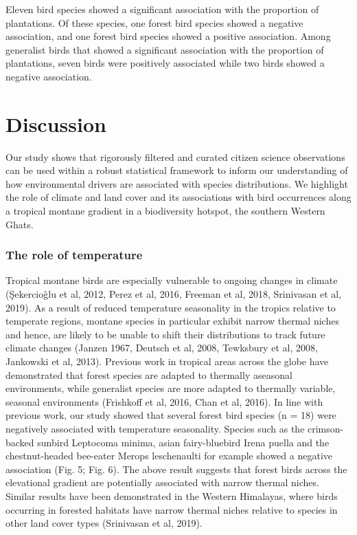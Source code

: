 Eleven bird species showed a significant association with the proportion of plantations.
Of these species, one forest bird species showed a negative association, and one forest bird species showed a positive association.
Among generalist birds that showed a significant association with the proportion of plantations, seven birds were positively associated while two birds showed a negative association.

\section*{Discussion}

Our study shows that rigorously filtered and curated citizen science observations can be used within a robust statistical framework to inform our understanding of how environmental drivers are associated with species distributions.
We highlight the role of climate and land cover and its associations with bird occurrences along a tropical montane gradient in a biodiversity hotspot, the southern Western Ghats.

\subsubsection*{The role of temperature}

Tropical montane birds are especially vulnerable to ongoing changes in climate (Şekercioĝlu et al, 2012, Perez et al, 2016, Freeman et al, 2018, Srinivasan et al, 2019).
As a result of reduced temperature seasonality in the tropics relative to temperate regions, montane species in particular exhibit narrow thermal niches and hence, are likely to be unable to shift their distributions to track future climate changes (Janzen 1967, Deutsch et al, 2008, Tewksbury et al, 2008, Jankowski et al, 2013).
Previous work in tropical areas across the globe have demonstrated that forest species are adapted to thermally aseasonal environments, while generalist species are more adapted to thermally variable, seasonal environments (Frishkoff et al, 2016, Chan et al, 2016).
In line with previous work, our study showed that several forest bird species (n = 18) were negatively associated with temperature seasonality.
Species such as the crimson-backed sunbird Leptocoma minima, asian fairy-bluebird Irena puella and the chestnut-headed bee-eater Merops leschenaulti for example showed a negative association (Fig. 5; Fig. 6).
The above result suggests that forest birds across the elevational gradient are potentially associated with narrow thermal niches.
Similar results have been demonstrated in the Western Himalayas, where birds occurring in forested habitats have narrow thermal niches relative to species in other land cover types (Srinivasan et al, 2019).

